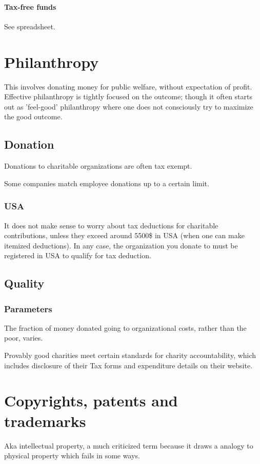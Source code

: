 \documentclass[oneside, article]{memoir}
\begin{document}
\subsubsection{Tax-free funds}
See spreadsheet.

\chapter{Philanthropy}
This involves donating money for public welfare, without expectation of profit. Effective philanthropy is tightly focused on the outcome; though it often starts out as 'feel-good' philanthropy where one does not consciously try to maximize the good outcome.

\section{Donation}
Donations to charitable organizations are often tax exempt.

Some companies match employee donations up to a certain limit.

\subsection{USA}
It does not make sense to worry about tax deductions for charitable contributions, unless they exceed around 5500\$ in USA (when one can make itemized deductions). In any case, the organization you donate to must be registered in USA to qualify for tax deduction.


\section{Quality}
\subsection{Parameters}
The fraction of money donated going to organizational costs, rather than the poor, varies. 

Provably good charities meet certain standards for charity accountability, which includes disclosure of their Tax forms and expenditure details on their website.

\chapter{Copyrights, patents and trademarks}
Aka intellectual property, a much criticized term because it draws a analogy to physical property which fails in some ways.
\end{document}
